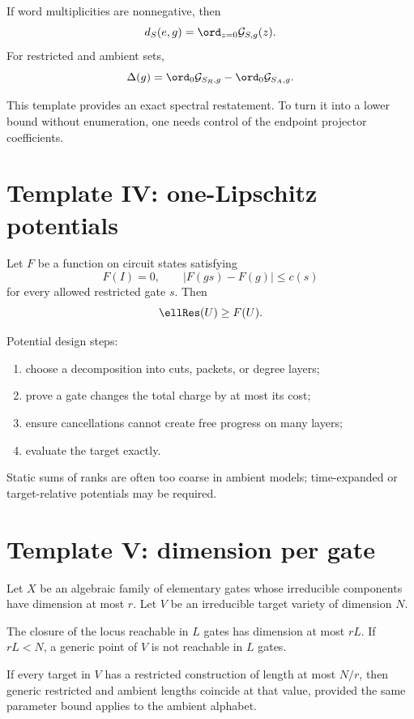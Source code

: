 \begin{theorem}
If word multiplicities are nonnegative, then
\[
d_S(e,g)=\ord_{z=0}\mathcal G_{S,g}(z).
\]
For restricted and ambient sets,
\[
\Delta(g)=\ord_0\mathcal G_{S_R,g}-\ord_0\mathcal G_{S_A,g}.
\]
\end{theorem}

This template provides an exact spectral restatement.  To turn it into a lower bound without enumeration, one needs control of the endpoint projector coefficients.

\section{Template IV: one-Lipschitz potentials}
Let $F$ be a function on circuit states satisfying
\[
F(I)=0,
\qquad
|F(gs)-F(g)|\le c(s)
\]
for every allowed restricted gate $s$.  Then
\[
\ellRes(U)\ge F(U).
\]

Potential design steps:
\begin{enumerate}
\item choose a decomposition into cuts, packets, or degree layers;
\item prove a gate changes the total charge by at most its cost;
\item ensure cancellations cannot create free progress on many layers;
\item evaluate the target exactly.
\end{enumerate}
Static sums of ranks are often too coarse in ambient models; time-expanded or target-relative potentials may be required.

\section{Template V: dimension per gate}
Let $X$ be an algebraic family of elementary gates whose irreducible components have dimension at most $r$.  Let $V$ be an irreducible target variety of dimension $N$.

\begin{theorem}
The closure of the locus reachable in $L$ gates has dimension at most $rL$.  If $rL<N$, a generic point of $V$ is not reachable in $L$ gates.
\end{theorem}

If every target in $V$ has a restricted construction of length at most $N/r$, then generic restricted and ambient lengths coincide at that value, provided the same parameter bound applies to the ambient alphabet.

